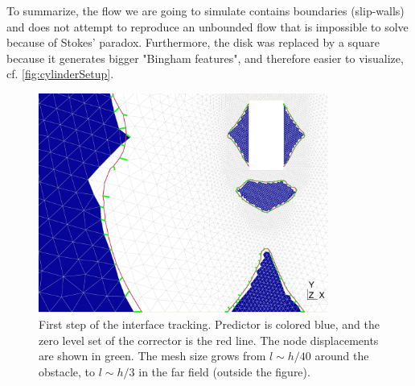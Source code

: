 \documentclass[11 pt]{report}
\begin{document}
To summarize, the flow we are going to simulate contains boundaries (slip-walls) and does not attempt to reproduce an unbounded flow that is impossible to solve because of Stokes' paradox. Furthermore, the disk was replaced by a square because it generates bigger "Bingham features", and therefore easier to visualize, cf. \cref{fig:cylinderSetup}.



\begin{figure}[!hb]
    \centering
    \includegraphics[width=0.85\textwidth]{../figures/cylinder_mesh.pdf}
    \caption{First step of the interface tracking. Predictor is colored blue, and the zero level set of the corrector is the red line. The node displacements are shown in green. The mesh size grows from $l \sim h/40$ around the obstacle, to $l \sim h/3$ in the far field (outside the figure).}
    \label{fig:cylinderTracking}
\end{figure}
\end{document}
